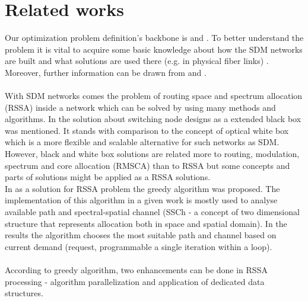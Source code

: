 \documentclass[conference]{IEEEtran}
\begin{document}
\section{Related works}
Our optimization problem definition's backbone is \cite{roza} and \cite{differential}. To better understand the problem it is vital to acquire some basic knowledge about how the SDM networks are built and what solutions are used there (e.g. in physical fiber links) \cite{sdm-intro}.
Moreover, further information can be drawn from \cite{rssa2} and \cite{walkoartykul}.
\\ \\
With SDM networks comes the problem of routing space and spectrum allocation (RSSA) inside a network which can be solved by using many methods and algorithms. In \cite{wb-box} the solution about  switching node designs as a extended black box was mentioned. It stands with comparison to the concept of optical white box which is a more flexible and scalable alternative for such networks as SDM. However, black and white box solutions are related more to routing, modulation, spectrum and core allocation (RMSCA) than to RSSA but some concepts and parts of solutions might be applied as a RSSA solutions.
\\
In \cite{sdm-walko} as a solution for RSSA problem the greedy algorithm was proposed. The implementation of this algorithm in a given work is mostly used to analyse available path and spectral-spatial channel (SSCh - a concept of two dimensional structure that represents allocation both in space and spatial domain). In the results the algorithm chooses the most suitable path and channel based on current demand (request, programmable a single iteration within a loop).
\\ \\
According to greedy algorithm, two enhancements can be done in RSSA processing - algorithm parallelization and application of dedicated
data structures\cite{rssa}.
\
\end{document}
